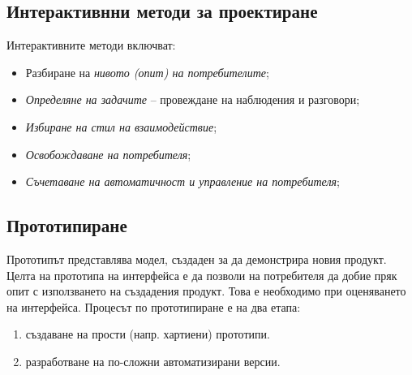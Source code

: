 \documentclass[fleqn,12pt]{article}
\begin{document}
\subsection{Интерактивнни методи за проектиране}

Интерактивните методи включват:
\begin{itemize}
    \item Разбиране на \textit{нивото (опит) на потребителите};
    \item \textit{Определяне на задачите} – провеждане на наблюдения и разговори;
    \item \textit{Избиране на стил на взаимодействие};
    \item \textit{Освобождаване на потребителя};
    \item \textit{Съчетаване на автоматичност и управление на потребителя};
\end{itemize}

\subsection{Прототипиране}

Прототипът представлява модел, създаден за да демонстрира новия продукт.
Целта на прототипа на интерфейса е да позволи на потребителя да добие пряк опит с използването на създадения продукт.
Това е необходимо при оценяването на интерфейса.
Процесът по прототипиране е на два етапа:
\begin{enumerate}
    \item създаване на прости (напр. хартиени) прототипи.
    \item разработване на по-сложни автоматизирани версии.
\end{enumerate}
\end{document}

